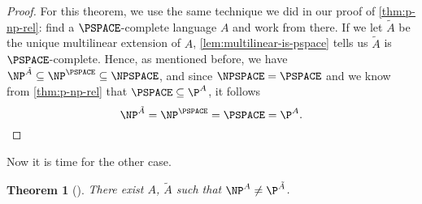 \documentclass[english,12pt]{reedthesis}
\theoremstyle{plain}
\newtheorem{thm}{Theorem}[section]
\theoremstyle{definition}
\theoremstyle{remark}
\begin{document}
\begin{proof}
  For this theorem, we use the same technique we did in our proof of
  \cref{thm:p-np-rel}: find a $\PSPACE$-complete language $A$ and work from
  there. If we let $\tilde{A}$ be the unique multilinear extension of $A$,
  \cref{lem:multilinear-is-pspace} tells us $\tilde{A}$ is $\PSPACE$-complete.
  Hence, as mentioned before, we have
  $\NP^{\tilde{A}} \subseteq \NP^{\PSPACE} \subseteq \NPSPACE$, and since $\NPSPACE = \PSPACE$
  and we know from \cref{thm:p-np-rel} that $\PSPACE \subseteq \P^{A}$, it follows
  \begin{equation*}
    \NP^{\tilde{A}} = \NP^{\PSPACE} = \PSPACE = \P^{A}.
  \end{equation*}
\end{proof}

Now it is time for the other case.

\begin{thm}[{\cite[Theorem 5.3]{AW09}}]\label{thm:p-np-nalg}
  There exist $A$, $\tilde{A}$ such that $\NP^{A} \ne \P^{\tilde{A}}$.
\end{thm}
\end{document}
